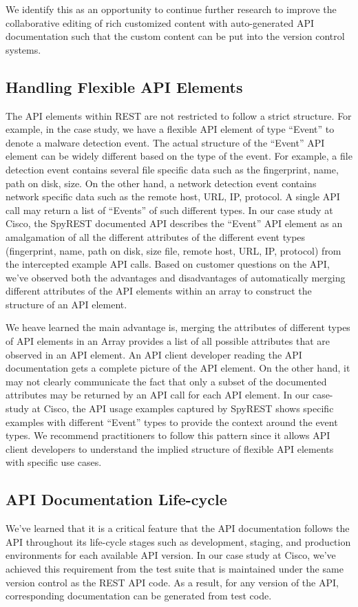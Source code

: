 \documentclass[10pt, conference]{IEEEtran}
\begin{document}
We identify this as an opportunity to continue further research to improve the collaborative editing of rich customized content with auto-generated API documentation such that the custom content can be put into the version control systems.

\subsection{Handling Flexible API Elements}
The API elements within REST are not restricted to follow a strict structure. For example, in the case study, we have a flexible API element of type ``Event'' to denote a malware detection event. The actual structure of the ``Event'' API element can be widely different based on the type of the event. For example, a file detection event contains several file specific data such as the fingerprint, name, path on disk, size. On the other hand, a network detection event contains network specific data such as the remote host, URL, IP, protocol. A single API call may return a list of ``Events'' of such different types. In our case study at Cisco, the SpyREST documented API describes the ``Event'' API element as an amalgamation of all the different attributes of the different event types (fingerprint, name, path on disk, size file, remote host, URL, IP, protocol) from the intercepted example API calls. Based on customer questions on the API, we've observed both the advantages and disadvantages of automatically merging different attributes of the API elements within an array to construct the structure of an API element.

We heave learned the main advantage is, merging the attributes of different types of API elements in an Array provides a list of all possible attributes that are observed in an API element. An API client developer reading the API documentation gets a complete picture of the API element. On the other hand, it may not clearly communicate the fact that only a subset of the documented attributes may be returned by an API call for each API element. In our case-study at Cisco, the API usage examples captured by SpyREST shows specific examples with different ``Event'' types to provide the context around the event types. We recommend practitioners to follow this pattern since it allows API client developers to understand the implied structure of flexible API elements with specific use cases.

\subsection{API Documentation Life-cycle}
We've learned that it is a critical feature that the API documentation follows the API throughout its life-cycle stages such as development, staging, and production environments for each available API version. In our case study at Cisco, we've achieved this requirement from the test suite that is maintained under the same version control as the REST API code. As a result, for any version of the API, corresponding documentation can be generated from test code.
\end{document}
